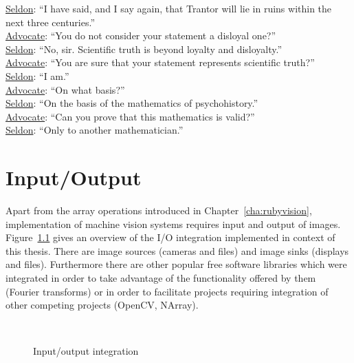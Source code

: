 \documentclass[12pt,a4paper,oneside,openright]{book}
\newcommand{\cha}[1]{Chapter~\ref{cha:#1}}
\newcommand{\fig}[1]{Figure~\ref{fig:#1}}
\begin{document}
\begin{CJK}{UTF8}{}
\begin{savequote}[8cm]
  \begin{singlespace}
    \underline{Seldon}: ``I have said, and I say again, that Trantor will lie in ruins within the next three centuries.''\\
    \underline{Advocate}: ``You do not consider your statement a disloyal one?''\\
    \underline{Seldon}: ``No, sir. Scientific truth is beyond loyalty and disloyalty.''\\
    \underline{Advocate}: ``You are sure that your statement represents scientific truth?''\\
    \underline{Seldon}: ``I am.''\\
    \underline{Advocate}: ``On what basis?''\\
    \underline{Seldon}: ``On the basis of the mathematics of psychohistory.''\\
    \underline{Advocate}: ``Can you prove that this mathematics is valid?''\\
    \underline{Seldon}: ``Only to another mathematician.''
  \end{singlespace}
\end{savequote}
\chapter{Input/Output}\label{cha:io}
Apart from the array operations introduced in \cha{rubyvision}, implementation of machine vision systems requires input and output of images. \fig{interfaces} gives an overview of the \ac{I}/\ac{O} integration implemented in context of this thesis. There are image sources (cameras and files) and image sinks (displays and files). Furthermore there are other popular free software libraries which were integrated in order to take advantage of the functionality offered by them (Fourier transforms) or in order to facilitate projects requiring integration of other competing projects (OpenCV, NArray).
\begin{figure}[htbp]
   \begin{center}
     \\
     \caption{Input/output integration\label{fig:interfaces}}
   \end{center}
\end{figure}


\end{CJK}
\end{document}
